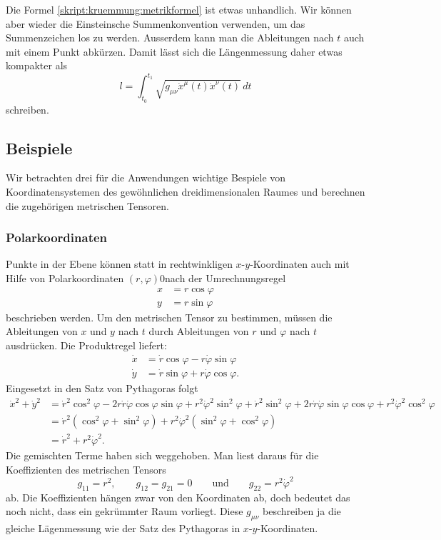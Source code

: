 Die Formel \eqref{skript:kruemmung:metrikformel} ist etwas unhandlich.
Wir können aber wieder die Einsteinsche Summenkonvention verwenden,
um das Summenzeichen los zu werden.
Ausserdem kann man die Ableitungen nach $t$ auch mit einem Punkt abkürzen.
Damit lässt sich die Längenmessung daher etwas kompakter als
\[
l=\int_{t_0}^{t_1} \sqrt{g_{\mu\nu}\dot x^{\mu}(t) \dot x^{\nu}(t)}\,dt
\]
schreiben.

\subsection{Beispiele}
Wir betrachten drei für die Anwendungen wichtige Bespiele von
Koordinatensystemen des gewöhnlichen dreidimensionalen Raumes
und berechnen die zugehörigen metrischen Tensoren.

\subsubsection{Polarkoordinaten}
Punkte in der Ebene können statt in rechtwinkligen $x$-$y$-Koordinaten
auch mit Hilfe von Polarkoordinaten $(r,\varphi)$0nach der Umrechnungsregel
\begin{align*}
x&=r\cos\varphi\\
y&=r\sin\varphi
\end{align*}
beschrieben werden.
Um den metrischen Tensor zu bestimmen, müssen die Ableitungen von $x$ 
und $y$ nach $t$ durch Ableitungen von $r$ und $\varphi$ nach $t$ 
ausdrücken.
Die Produktregel liefert:
\begin{align*}
\dot x&= \dot r\cos \varphi - r\dot\varphi \sin\varphi 
\\
\dot y&= \dot r\sin\varphi + r\dot\varphi\cos\varphi.
\end{align*}
Eingesetzt in den Satz von Pythagoras folgt
\begin{align*}
\dot x^2 + \dot y^2
&=
\dot r^2\cos^2\varphi -2r\dot r\dot\varphi\cos\varphi\sin\varphi +r^2\dot \varphi^2\sin^2\varphi
+
\dot r^2\sin^2\varphi +2r\dot r\dot\varphi\sin\varphi\cos\varphi +r^2\dot\varphi^2\cos^2\varphi
\\
&=
\dot r^2(\cos^2\varphi+\sin^2\varphi)+ r^2\dot\varphi^2(\sin^2\varphi+\cos^2\varphi)
\\
&=\dot r^2 + r^2\dot\varphi^2.
\end{align*}
Die gemischten Terme haben sich weggehoben.
Man liest daraus für die Koeffizienten des metrischen Tensors
\[
g_{11}=r^2,\qquad g_{12}=g_{21}=0\qquad\text{und}\qquad g_{22}=r^2\dot\varphi^2
\]
ab.
Die Koeffizienten hängen zwar von den Koordinaten ab, doch bedeutet
das noch nicht, dass ein gekrümmter Raum vorliegt.
Diese $g_{\mu\nu}$ beschreiben ja die gleiche Lägenmessung wie der Satz
des Pythagoras in $x$-$y$-Koordinaten.

